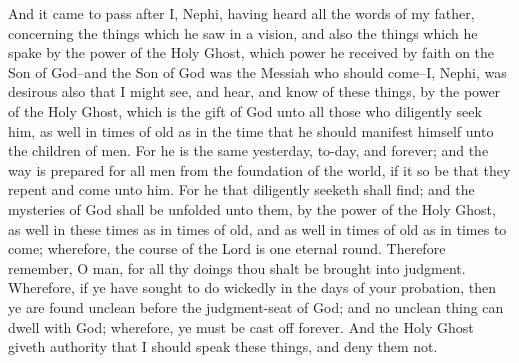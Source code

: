 And it came to pass after I, Nephi, having heard all the words of my father, concerning the things which he saw in a vision, and also the things which he spake by the power of the Holy Ghost, which power he received by faith on the Son of God--and the Son of God was the Messiah who should come--I, Nephi, was desirous also that I might see, and hear, and know of these things, by the power of the Holy Ghost, which is the gift of God unto all those who diligently seek him, as well in times of old as in the time that he should manifest himself unto the children of men.
\bverse \iffalse For he is the same yesterday, to-day, and forever; and the way is prepared for all men from the foundation of the world, if it so be that they repent and come unto him. \fi
For he is the same yesterday, to-day, and forever; and the way is prepared for all men from the foundation of the world, if it so be that they repent and come unto him.
\bverse \iffalse For he that diligently seeketh shall find; and the mysteries of God shall be unfolded unto them, by the power of the Holy Ghost, as well in these times as in times of old, and as well in times of old as in times to come; wherefore, the course of the Lord is one eternal round. \fi
For he that diligently seeketh shall find; and the mysteries of God shall be unfolded unto them, by the power of the Holy Ghost, as well in these times as in times of old, and as well in times of old as in times to come; wherefore, the course of the Lord is one eternal round.
\bverse \iffalse Therefore remember, O man, for all thy doings thou shalt be brought into judgment. \fi
Therefore remember, O man, for all thy doings thou shalt be brought into judgment.
\bverse \iffalse Wherefore, if ye have sought to do wickedly in the days of your probation, then ye are found unclean before the judgment-seat of God; and no unclean thing can dwell with God; wherefore, ye must be cast off forever. \fi
Wherefore, if ye have sought to do wickedly in the days of your probation, then ye are found unclean before the judgment-seat of God; and no unclean thing can dwell with God; wherefore, ye must be cast off forever.
\bverse \iffalse And the Holy Ghost giveth authority that I should speak these things, and deny them not. \fi
And the Holy Ghost giveth authority that I should speak these things, and deny them not.

